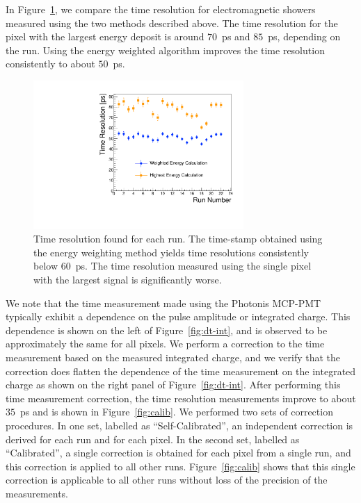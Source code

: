 In Figure~\ref{fig:wtres}, we compare the time resolution for electromagnetic
showers measured using the two methods described above. The time resolution for
the pixel with the largest energy deposit is around $70$~ps and $85$~ps,
depending on the run. Using the energy weighted algorithm improves the time
resolution consistently to about $50$~ps. 

\begin{figure}[htbp] 
\centering
\includegraphics[width=8cm]{Images/wtres/tresperrun.pdf} 
\caption{\small Time resolution found for each run. The time-stamp obtained using the energy weighting method yields time resolutions consistently below $60$~ps. The time resolution measured using the single pixel with the largest signal is significantly worse.} 
\label{fig:wtres} 
\end{figure} 

We note that the time measurement made using the Photonis MCP-PMT typically exhibit
a dependence on the pulse amplitude or integrated charge. This dependence is
shown on the left of Figure~\ref{fig:dt-int}, and is observed to be
approximately the same for all pixels. We perform a correction to the time
measurement based on the measured integrated charge, and we verify that the
correction does flatten the dependence of the time measurement on the integrated
charge as shown on the right panel of Figure~\ref{fig:dt-int}. After performing
this time measurement correction, the time resolution measurements improve to
about $35$~ps and is shown in Figure~\ref{fig:calib}. We performed two sets of
correction procedures. In one set, labelled as ``Self-Calibrated'', an
independent correction is derived for each run and for each pixel. In the second
set, labelled as ``Calibrated'', a single correction is obtained for each pixel
from a single run, and this correction is applied to all other runs.
Figure~\ref{fig:calib} shows that this single correction is applicable to all
other runs without loss of the precision of the measurements. 

